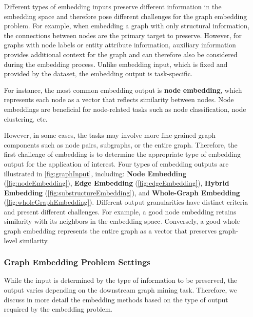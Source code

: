 Different types of embedding inputs preserve different information in the embedding space and therefore pose different challenges for the graph embedding problem. 
For example, when embedding a graph with only structural information, the connections between nodes are the primary target to preserve. However, for graphs with node labels or entity attribute information, auxiliary information provides additional context for the graph and can therefore also be considered during the embedding process. Unlike embedding input, which is fixed and provided by the dataset, the embedding output is task-specific.

For instance, the most common embedding output is \textbf{node embedding}, which represents each node as a vector that reflects similarity between nodes. Node embeddings are beneficial for node-related tasks such as node classification, node clustering, etc.

However, in some cases, the tasks may involve more fine-grained graph components such as node pairs, subgraphs, or the entire graph. Therefore, the first challenge of embedding is to determine the appropriate type of embedding output for the application of interest. Four types of embedding outputs are illustrated in \autoref{fig:graphInput}, including: \textbf{Node Embedding} (\ref{fig:nodeEmbedding}), \textbf{Edge Embedding} (\ref{fig:edgeEmbedding}), \textbf{Hybrid Embedding} (\ref{fig:substructureEmbedding}), and \textbf{Whole-Graph Embedding} (\ref{fig:wholeGraphEmbedding}). Different output granularities have distinct criteria and present different challenges. For example, a good node embedding retains similarity with its neighbors in the embedding space. Conversely, a good whole-graph embedding represents the entire graph as a vector that preserves graph-level similarity.


\subsubsection{Graph Embedding Problem Settings}

While the input is determined by the type of information to be preserved, the output varies depending on the downstream graph mining task. Therefore, we discuss in more detail the embedding methods based on the type of output required by the embedding problem.


